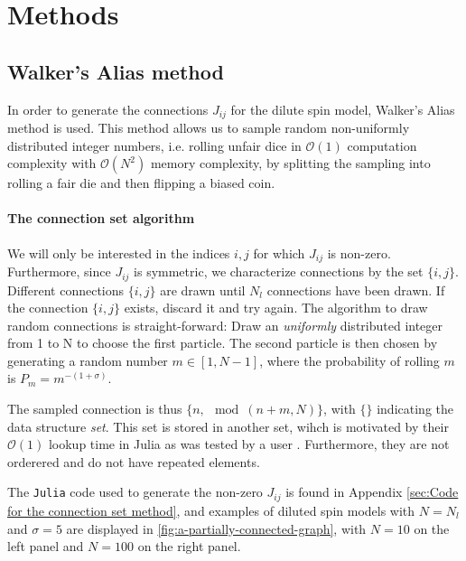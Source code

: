 \section{Methods}
\subsection{Walker's Alias method}

In order to generate the connections $J_{ij}$ for the dilute spin model, Walker's Alias \cite{Walker1974} method is used. This method allows us to sample random non-uniformly distributed integer numbers, i.e. rolling unfair dice in $\mathcal{O}(1)$ computation complexity with $\mathcal{O}(N^2)$ memory complexity, by splitting the sampling into rolling a fair die and then flipping a biased coin. 

\paragraph{The connection set algorithm}%
\label{sub:The connection set algorithm}

We will only be interested in the indices $i, j$ for which  $J_{ij}$ is non-zero. Furthermore, since $J_{ij}$ is symmetric, we characterize connections by the set $\{i, j\}$.
Different connections $\{i, j\}$ are drawn until $N_l$ connections have been drawn. If the connection  $\{i, j\}$ exists, discard it and try again. The algorithm to draw random connections is straight-forward: Draw an \textit{uniformly} distributed integer from 1 to N to choose the first particle. The second particle is then chosen by generating a random number $m \in [1, N-1]$, where the probability of rolling $m$ is  $P_m = m^{-(1+\sigma)}$. 

The sampled connection is thus $\{n, \mod(n+m, N)\}$, with $\{\}$ indicating the data structure \textit{set}. This set is stored in another set, wihch is motivated by their $\mathcal{O}(1)$ lookup time in Julia as was tested by a user \cite{setTime}. Furthermore, they are not orderered and do not have repeated elements.

The \texttt{Julia} code used to generate the non-zero $J_{ij}$ is found in Appendix \ref{sec:Code for the connection set method}, and examples of diluted spin models with $N=N_l$ and $\sigma = 5$ are displayed in \ref{fig:a-partially-connected-graph}, with $N=10$ on the left panel and $N=100$ on the right panel.

